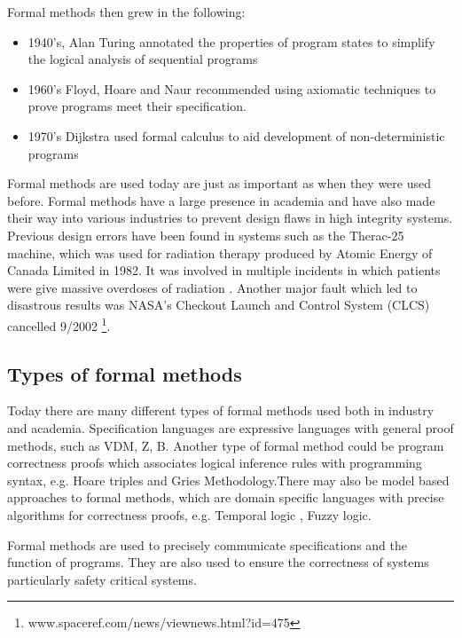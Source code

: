 Formal methods then grew in the following:

\begin{itemize}
\item 1940's, Alan Turing annotated the properties of program states to simplify
the logical analysis of sequential programs

\item 1960's Floyd, Hoare and Naur recommended using axiomatic techniques to
prove programs meet their specification.

\item 1970's Dijkstra used formal calculus to aid development of
non-deterministic programs
\end{itemize}

Formal methods are used today are just as important as when they were used
before. Formal methods have a large presence in academia and have also made
their way into various industries to prevent design flaws in high integrity
systems. Previous design errors have been found in systems such as the Therac-25
machine, which was used for radiation therapy produced by Atomic Energy of
Canada Limited in 1982. It was involved in multiple incidents in which patients
were give massive overdoses of radiation \cite{baase2003gift}. Another major
fault which led to disastrous results was NASA’s Checkout Launch and Control
System (CLCS) cancelled 9/2002
\footnote{www.spaceref.com/news/viewnews.html?id=475}.

\subsection{Types of formal methods}


Today there are many different types of formal methods used both in industry and
academia. Specification languages are expressive languages with general proof
methods, such as VDM, Z, B. Another type of formal method could be program
correctness proofs which associates logical inference rules with programming
syntax, e.g. Hoare triples and Gries Methodology.There may also be model based
approaches to formal methods, which are domain specific languages with precise
algorithms for correctness proofs, e.g. Temporal logic \cite{uwa}, Fuzzy logic.

Formal methods are used to precisely communicate specifications and the function
of programs. They are also used to ensure the correctness of systems
particularly safety critical systems.

